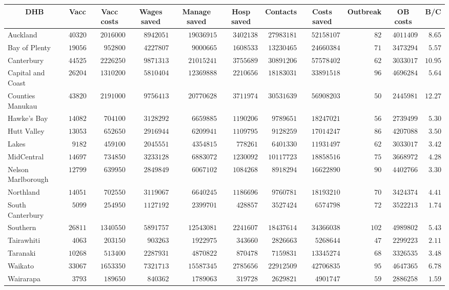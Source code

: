 \documentclass{article}
\begin{document}
\begin{table}\small
\begin{center}
\begin{tabular}{lrrrrrrrrrr}
\hline\hline
\multicolumn{1}{c}{DHB}&\multicolumn{1}{c}{Vacc}&\multicolumn{1}{c}{Vacc costs}&\multicolumn{1}{c}{Wages saved}&\multicolumn{1}{c}{Manage saved}&\multicolumn{1}{c}{Hosp saved}&\multicolumn{1}{c}{Contacts}&\multicolumn{1}{c}{Costs saved}&\multicolumn{1}{c}{Outbreak}&\multicolumn{1}{c}{OB costs}&\multicolumn{1}{c}{B/C}\tabularnewline
\hline
Auckland&$40320$&$2016000$&$ 8942051$&$19036915$&$3402138$&$27983181$&$52158107$&$ 82$&$4011409$&$ 8.65$\tabularnewline
Bay of Plenty&$19056$&$ 952800$&$ 4227807$&$ 9000665$&$1608533$&$13230465$&$24660384$&$ 71$&$3473294$&$ 5.57$\tabularnewline
Canterbury&$44525$&$2226250$&$ 9871313$&$21015241$&$3755689$&$30891206$&$57578402$&$ 62$&$3033017$&$10.95$\tabularnewline
Capital and Coast&$26204$&$1310200$&$ 5810404$&$12369888$&$2210656$&$18183031$&$33891518$&$ 96$&$4696284$&$ 5.64$\tabularnewline
Counties Manukau&$43820$&$2191000$&$ 9756413$&$20770628$&$3711974$&$30531639$&$56908203$&$ 50$&$2445981$&$12.27$\tabularnewline
Hawke's Bay&$14082$&$ 704100$&$ 3128292$&$ 6659885$&$1190206$&$ 9789651$&$18247021$&$ 56$&$2739499$&$ 5.30$\tabularnewline
Hutt Valley&$13053$&$ 652650$&$ 2916944$&$ 6209941$&$1109795$&$ 9128259$&$17014247$&$ 86$&$4207088$&$ 3.50$\tabularnewline
Lakes&$ 9182$&$ 459100$&$ 2045551$&$ 4354815$&$ 778261$&$ 6401330$&$11931497$&$ 62$&$3033017$&$ 3.42$\tabularnewline
MidCentral&$14697$&$ 734850$&$ 3233128$&$ 6883072$&$1230092$&$10117723$&$18858516$&$ 75$&$3668972$&$ 4.28$\tabularnewline
Nelson Marlborough&$12799$&$ 639950$&$ 2849849$&$ 6067102$&$1084268$&$ 8918294$&$16622890$&$ 90$&$4402766$&$ 3.30$\tabularnewline
Northland&$14051$&$ 702550$&$ 3119067$&$ 6640245$&$1186696$&$ 9760781$&$18193210$&$ 70$&$3424374$&$ 4.41$\tabularnewline
South Canterbury&$ 5099$&$ 254950$&$ 1127192$&$ 2399701$&$ 428857$&$ 3527424$&$ 6574798$&$ 72$&$3522213$&$ 1.74$\tabularnewline
Southern&$26811$&$1340550$&$ 5891757$&$12543081$&$2241607$&$18437614$&$34366038$&$102$&$4989802$&$ 5.43$\tabularnewline
Tairawhiti&$ 4063$&$ 203150$&$  903263$&$ 1922975$&$ 343660$&$ 2826663$&$ 5268644$&$ 47$&$2299223$&$ 2.11$\tabularnewline
Taranaki&$10268$&$ 513400$&$ 2287931$&$ 4870822$&$ 870478$&$ 7159831$&$13345274$&$ 68$&$3326535$&$ 3.48$\tabularnewline
Waikato&$33067$&$1653350$&$ 7321713$&$15587345$&$2785656$&$22912509$&$42706835$&$ 95$&$4647365$&$ 6.78$\tabularnewline
Wairarapa&$ 3793$&$ 189650$&$  840362$&$ 1789063$&$ 319728$&$ 2629821$&$ 4901747$&$ 59$&$2886258$&$ 1.59$\tabularnewline

\end{tabular}
\end{center}
\end{table}
\end{document}
